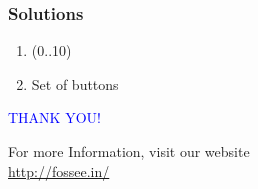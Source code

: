 \documentclass[presentation]{beamer}
\begin{document}
\begin{frame}
\frametitle{Solutions}
\label{sec-8}


\begin{enumerate}
\item (0..10)
\vspace{12pt}
\item Set of buttons
\end{enumerate}
\end{frame}
\begin{frame}

  \begin{block}{}
  \begin{center}
  \textcolor{blue}{\Large THANK YOU!} 
  \end{center}
  \end{block}
\begin{block}{}
  \begin{center}
    For more Information, visit our website\\
    \url{http://fossee.in/}
  \end{center}  
  \end{block}
\end{frame}
\end{document}

